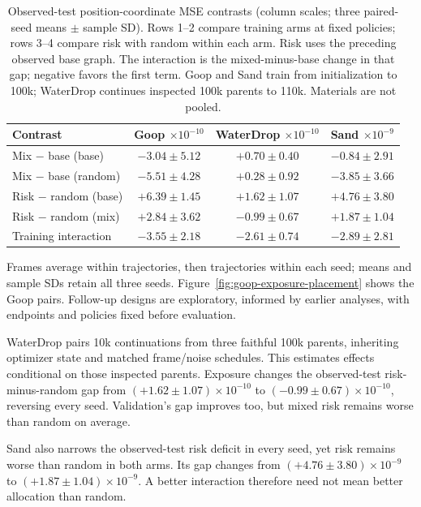 \begin{table}[t]
\centering\scriptsize
\caption{Observed-test position-coordinate MSE contrasts (column scales; three paired-seed means $\pm$ sample SD). Rows 1--2 compare training arms at fixed policies; rows 3--4 compare risk with random within each arm. Risk uses the preceding observed base graph. The interaction is the mixed-minus-base change in that gap; negative favors the first term. Goop and Sand train from initialization to 100k; WaterDrop continues inspected 100k parents to 110k. Materials are not pooled.}
\label{tab:goop-exposure-placement}
\setlength{\tabcolsep}{2pt}
\begin{tabular}{lccc}
\toprule
Contrast & \shortstack{Goop\\$\times10^{-10}$} & \shortstack{WaterDrop\\$\times10^{-10}$} & \shortstack{Sand\\$\times10^{-9}$}\\
\midrule
Mix $-$ base (base) & $-3.04\pm5.12$ & $+0.70\pm0.40$ & $-0.84\pm2.91$\\
Mix $-$ base (random) & $-5.51\pm4.28$ & $+0.28\pm0.92$ & $-3.85\pm3.66$\\
Risk $-$ random (base) & $+6.39\pm1.45$ & $+1.62\pm1.07$ & $+4.76\pm3.80$\\
Risk $-$ random (mix) & $+2.84\pm3.62$ & $-0.99\pm0.67$ & $+1.87\pm1.04$\\
Training interaction & $-3.55\pm2.18$ & $-2.61\pm0.74$ & $-2.89\pm2.81$\\
\bottomrule
\end{tabular}
\end{table}

Frames average within trajectories, then trajectories within each seed; means and sample SDs retain all three seeds. Figure~\ref{fig:goop-exposure-placement} shows the Goop pairs. Follow-up designs are exploratory, informed by earlier analyses, with endpoints and policies fixed before evaluation.

WaterDrop pairs 10k continuations from three faithful 100k parents, inheriting optimizer state and matched frame/noise schedules. This estimates effects conditional on those inspected parents. Exposure changes the observed-test risk-minus-random gap from $(+1.62\pm1.07)\times10^{-10}$ to $(-0.99\pm0.67)\times10^{-10}$, reversing every seed. Validation's gap improves too, but mixed risk remains worse than random on average.

Sand also narrows the observed-test risk deficit in every seed, yet risk remains worse than random in both arms. Its gap changes from $(+4.76\pm3.80)\times10^{-9}$ to $(+1.87\pm1.04)\times10^{-9}$. A better interaction therefore need not mean better allocation than random.


